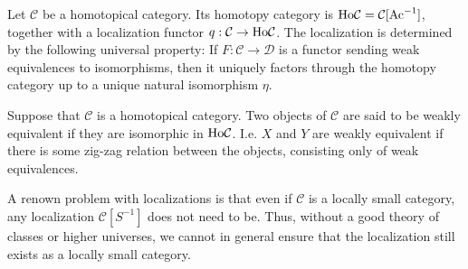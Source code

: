\documentclass[../thesis.tex]{subfiles}
\begin{document}
            \begin{definition}
                Let $\mathcal{C}$ be a homotopical category. Its homotopy category is $\tt{Ho}\mathcal{C} = \mathcal{C}[\tt{Ac}^{-1}]$, together with a localization functor $q:\mathcal{C}\rightarrow \tt{Ho}\mathcal{C}$. The localization is determined by the following universal property: If $F:\mathcal{C}\rightarrow \mathcal{D}$ is a functor sending weak equivalences to isomorphisms, then it uniquely factors through the homotopy category up to a unique natural isomorphism $\eta$.

                \begin{center}
                \end{center}
            \end{definition}

            \begin{definition}
                Suppose that $\mathcal{C}$ is a homotopical category. Two objects of $\mathcal{C}$ are said to be weakly equivalent if they are isomorphic in $\tt{Ho}\mathcal{C}$. I.e. $X$ and $Y$ are weakly equivalent if there is some zig-zag relation between the objects, consisting only of weak equivalences.
                \begin{center}
                \end{center}
            \end{definition}

            \begin{remark}
                A renown problem with localizations is that even if $\mathcal{C}$ is a locally small category, any localization $\mathcal{C}[S^{-1}]$ does not need to be. Thus, without a good theory of classes or higher universes, we cannot in general ensure that the localization still exists as a locally small category.
            \end{remark}
\end{document}
